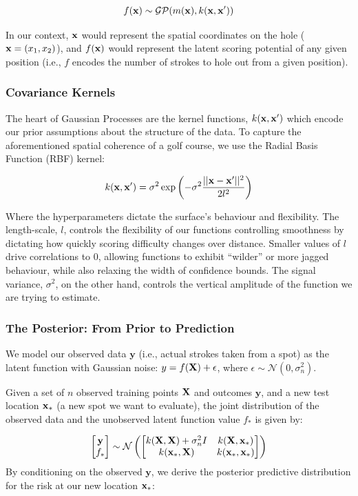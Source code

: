 \documentclass[11pt, letterpaper]{article}
\begin{document}
$$f(\mathbf{x}) \sim \mathcal{GP}(m(\mathbf{x}), k(\mathbf{x},\mathbf{x}'))$$

In our context, $\mathbf{x}$ would represent the spatial coordinates on the hole ($\mathbf{x} = (x_1, x_2)$), and $f(\mathbf{x})$ would represent the latent scoring potential of any given position (i.e., $f$ encodes the number of strokes to hole out from a given position).

\subsubsection{Covariance Kernels}
The heart of Gaussian Processes are the kernel functions, $k(\mathbf{x},\mathbf{x}')$ which encode our prior assumptions about the structure of the data. To capture the aforementioned spatial coherence of a golf course, we use the Radial Basis Function (RBF) kernel:

$$k(\mathbf{x},\mathbf{x}') = \sigma^2 \exp\left(-\sigma^2\frac{||\mathbf{x}-\mathbf{x}'||^2}{2l^2}\right)$$

Where the hyperparameters dictate the surface's behaviour and flexibility. The length-scale, $l$, controls the flexibility of our functions controlling smoothness by dictating how quickly scoring difficulty changes over distance. Smaller values of $l$ drive correlations to 0, allowing functions to exhibit ``wilder'' or more jagged behaviour, while also relaxing the width of confidence bounds. The signal variance, $\sigma^2$, on the other hand, controls the vertical amplitude of the function we are trying to estimate.

\subsubsection{The Posterior: From Prior to Prediction}

We model our observed data $\mathbf{y}$ (i.e., actual strokes taken from a spot) as the latent function with Gaussian noise: $y = f(\mathbf{X}) + \epsilon$, where $\epsilon \sim \mathcal{N}(0, \sigma^2_n)$. 

Given a set of $n$ observed training points $\mathbf{X}$ and outcomes $\mathbf{y}$, and a new test location $\mathbf{x}_*$ (a new spot we want to evaluate), the joint distribution of the observed data and the unobserved latent function value $f_*$ is given by:

\begin{align*}
    \begin{bmatrix}
        \mathbf{y}\\
        f_*
    \end{bmatrix} \sim 
    \mathcal{N}\left (\begin{bmatrix}
        k(\mathbf{X},\mathbf{X}) + \sigma^2_nI & k(\mathbf{X},\mathbf{x}_*) \\
        k(\mathbf{x}_*, \mathbf{X}) & k(\mathbf{x}_*, \mathbf{x}_*)
    \end{bmatrix}\right)
\end{align*}
 By conditioning on the observed $\mathbf{y}$, we derive the posterior predictive distribution for the risk at our new location $\mathbf{x}_*$:
\end{document}
